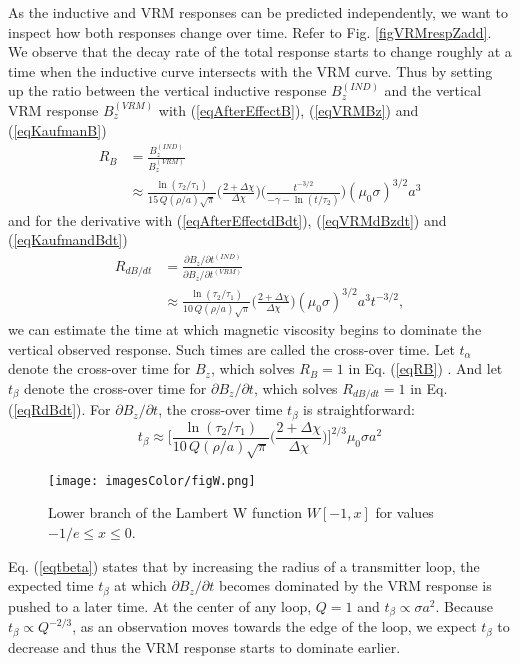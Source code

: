 \documentclass[journal]{IEEEtran}  %
\begin{document}
As the inductive and VRM responses can be predicted independently,
we want to inspect how both responses change over time. Refer to
Fig. \ref{figVRMrespZadd}. We observe that the decay rate of the total
response starts to change roughly at a time when the inductive curve
intersects with the VRM curve. Thus by setting up the ratio between
the vertical inductive response $B_z^{(IND)}$ and the vertical VRM
response $B_z^{(VRM)}$ with (\ref{eqAfterEffectB}), (\ref{eqVRMBz})
and (\ref{eqKaufmanB})
\begin{align}
R_B &= \frac{B_z^{(IND)}}{B_z^{(VRM)} } \nonumber \\
&\approx \! \frac{\ln(\tau_2/\tau_1)}{15 \, Q(\rho /a) \sqrt{\pi}}
\! \Bigg ( \frac{2+\Delta \chi}{\Delta \chi} \Bigg ) \! \Bigg (
\frac{t^{-3/2}}{-\gamma - \ln(t/ \tau_2)} \Bigg ) \! (\mu_0
\sigma)^{3/2} a^3 \label{eqRB}
\end{align}
and for the derivative with (\ref{eqAfterEffectdBdt}),
(\ref{eqVRMdBzdt}) and (\ref{eqKaufmandBdt})
\begin{align}
R_{dB/dt} &= \frac{\partial B_z/ \partial t^{(IND)}}{\partial B_z/\partial t^{(VRM)} }  \nonumber \\
&\approx \frac{\ln(\tau_2/\tau_1)}{10 \, Q (\rho /a) \sqrt{\pi}}
\Bigg ( \frac{2+\Delta \chi}{\Delta \chi} \Bigg ) (\mu_0
\sigma)^{3/2} a^3 t^{-3/2}, \label{eqRdBdt}
\end{align}
we can estimate the time at which magnetic viscosity begins to
dominate the vertical observed response. Such times are called the
cross-over time. Let $t_{\alpha}$ denote the cross-over time for $B_z$,
which solves $R_B=1$ in Eq. (\ref{eqRB}) . And let $t_{\beta}$ denote 
the cross-over time for $\partial B_z/\partial t$, which solves $R_{dB/dt}=1$
in Eq. (\ref{eqRdBdt}). For $\partial B_z/\partial t$, the cross-over time $t_\beta$ is
straightforward:
\begin{equation}
\label{eqtbeta} t_{\beta} \approx \Bigg [
\frac{\ln(\tau_2/\tau_1)}{10 \, Q (\rho /a) \sqrt{\pi}} \Bigg  (
\frac{2+\Delta \chi}{\Delta \chi} \Bigg ) \Bigg ]^{2/3} \mu_0 \sigma
a^2
\end{equation}
\begin{figure}[!t]
\centering
\vspace{-10pt}
\texttt{[image: imagesColor/figW.png]}
\caption{Lower branch of the Lambert W function $W[-1,x]$ for values $-1/e \leq x \leq 0$.}
\label{figW}
\end{figure}
Eq. (\ref{eqtbeta}) states that by increasing the radius of a
transmitter loop,  the expected time $t_\beta$ at which $\partial
B_z/\partial t$ becomes dominated by the VRM response is pushed to a
later time. At the center of any loop, $Q=1$ and $t_{\beta} \propto
\sigma a^2$. Because $t_\beta \propto Q^{-2/3}$, as an
observation moves towards the edge of the loop, we expect $t_\beta$
to decrease and thus the VRM response starts to dominate earlier.
\end{document}

